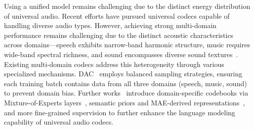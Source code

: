 \documentclass[11pt]{article}
\begin{document}

Using a unified model remains challenging due to the distinct energy distribution of universal audio. Recent efforts have pursued universal codecs capable of handling diverse audio types. However, achieving strong multi-domain performance remains challenging due to the distinct acoustic characteristics across domains—speech exhibits narrow-band harmonic structure, music requires wide-band spectral richness, and sound encompasses diverse sound textures~\cite{scharf1970critical}. Existing multi-domain codecs address this heterogeneity through various specialized mechanisms. DAC~\cite{kumar2023high} employs balanced sampling strategies, ensuring each training batch contains data from all three domains (speech, music, sound) to prevent domain bias. 
Further works~\cite{jiang2025unicodec, liu2024semanticodec, yang2025almtokenizer} introduce domain-specific codebooks via Mixture-of-Experts layers~\cite{MoE}, semantic priors and MAE-derived representations~\cite{MAE, huang2022masked}, and more fine-grained supervision to further enhance the language modeling capability of universal audio codecs.
\end{document}
